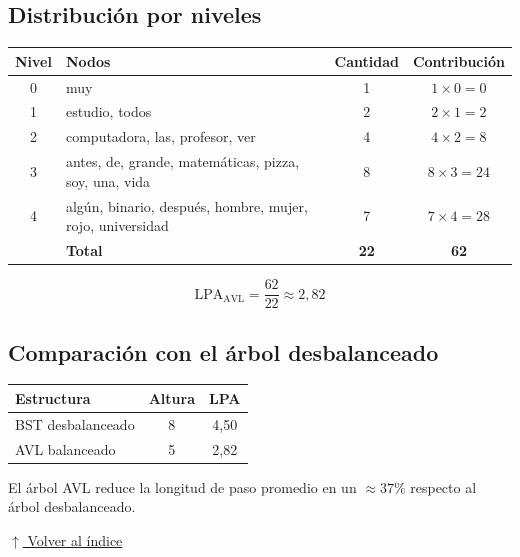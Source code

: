 \documentclass[12pt]{article}
\newcommand{\volverindice}{%
    \vspace{1em}%
    \begin{flushright}%
        \hyperlink{indice}{\small $\uparrow$ Volver al índice}%
    \end{flushright}%
}
\begin{document}
\newpage
\subsection*{Distribución por niveles}

\begin{center}
\begin{tabular}{clcc}
\toprule
\textbf{Nivel} & \textbf{Nodos} & \textbf{Cantidad} & \textbf{Contribución} \\
\midrule
0 & muy                                                             & 1 & $1 \times 0 = 0$  \\
1 & estudio, todos                                                  & 2 & $2 \times 1 = 2$  \\
2 & computadora, las, profesor, ver                                 & 4 & $4 \times 2 = 8$  \\
3 & antes, de, grande, matemáticas, pizza, soy, una, vida          & 8 & $8 \times 3 = 24$ \\
4 & algún, binario, después, hombre, mujer, rojo, universidad       & 7 & $7 \times 4 = 28$ \\
\midrule
  & \textbf{Total}                                                  & \textbf{22} & \textbf{62} \\
\bottomrule
\end{tabular}
\end{center}

\[
\text{LPA}_{\text{AVL}} = \frac{62}{22} \approx 2{,}82
\]

\subsection*{Comparación con el árbol desbalanceado}

\begin{center}
\begin{tabular}{lcc}
\toprule
\textbf{Estructura} & \textbf{Altura} & \textbf{LPA} \\
\midrule
BST desbalanceado   & 8               & 4,50 \\
AVL balanceado      & 5               & 2,82 \\
\bottomrule
\end{tabular}
\end{center}

El árbol AVL reduce la longitud de paso promedio en un
$\approx 37\%$ respecto al árbol desbalanceado.

\volverindice
\end{document}
